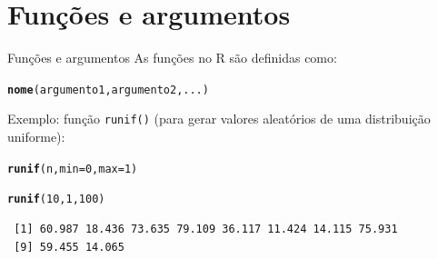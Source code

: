 \documentclass[10pt,handout]{beamer}\usepackage[]{graphicx}\usepackage[]{color}
\makeatletter
\newcommand{\hlnum}[1]{\textcolor[rgb]{0.686,0.059,0.569}{#1}}%
\newcommand{\hlstd}[1]{\textcolor[rgb]{0.345,0.345,0.345}{#1}}%
\newcommand{\hlkwc}[1]{\textcolor[rgb]{0.333,0.667,0.333}{#1}}%
\newcommand{\hlkwd}[1]{\textcolor[rgb]{0.282,0.239,0.545}{\textbf{#1}}}%
\newenvironment{kframe}{%
 \def\at@end@of@kframe{}%
 \ifinner\ifhmode%
  \def\at@end@of@kframe{\end{minipage}}%
  \begin{minipage}{\columnwidth}%
 \fi\fi%
 \def\FrameCommand##1{\hskip\@totalleftmargin \hskip-\fboxsep
 \colorbox{shadecolor}{##1}\hskip-\fboxsep
     \hskip-\linewidth \hskip-\@totalleftmargin \hskip\columnwidth}%
 \MakeFramed {\advance\hsize-\width
   \@totalleftmargin\z@ \linewidth\hsize
   \@setminipage}}%
 {\par\unskip\endMakeFramed%
 \at@end@of@kframe}
\newenvironment{knitrout}{}{} %
\makeatother
\begin{document}
\section{Funções e argumentos}

\begin{frame}[fragile]{Funções e argumentos}
As funções no R são definidas como:
\begin{knitrout}\small
{}\color{fgcolor}\begin{kframe}
\begin{alltt}
\hlkwd{nome}\hlstd{(argumento1, argumento2, ...)}
\end{alltt}
\end{kframe}
\end{knitrout}

Exemplo: função \verb|runif()| (para gerar valores aleatórios de uma
distribuição uniforme):
\begin{knitrout}\small
{}\color{fgcolor}\begin{kframe}
\begin{alltt}
\hlkwd{runif}\hlstd{(n,} \hlkwc{min} \hlstd{=} \hlnum{0}\hlstd{,} \hlkwc{max} \hlstd{=} \hlnum{1}\hlstd{)}
\end{alltt}
\end{kframe}
\end{knitrout}

\begin{knitrout}\small
{}\color{fgcolor}\begin{kframe}
\begin{alltt}
\hlkwd{runif}\hlstd{(}\hlnum{10}\hlstd{,} \hlnum{1}\hlstd{,} \hlnum{100}\hlstd{)}
\end{alltt}
\begin{verbatim}
 [1] 60.987 18.436 73.635 79.109 36.117 11.424 14.115 75.931
 [9] 59.455 14.065
\end{verbatim}
\end{kframe}
\end{knitrout}

\end{frame}
\end{document}
